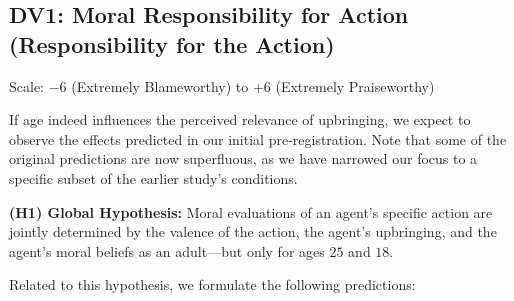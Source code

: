 \documentclass[scrarticle]{scrartcl}
\begin{document}
\subsection*{DV1: Moral Responsibility for Action (Responsibility for the Action)}
Scale: $-6$ (Extremely Blameworthy) to $+6$ (Extremely Praiseworthy)

\vspace{0.75em}
\noindent If age indeed influences the perceived relevance of upbringing, we expect to observe the effects predicted in our initial pre-registration.
Note that some of the original predictions are now superfluous, as we have narrowed our focus to a specific subset of the earlier study's conditions.

\vspace{0.75em}
\noindent \textsf{\textbf{(H1) Global Hypothesis:}}
Moral evaluations of an agent's specific action are jointly determined by the valence of the action, the agent's upbringing, and the agent's moral beliefs as an adult---but only for ages $25$ and $18$.

\vspace{0.75em}
\noindent Related to this hypothesis, we formulate the following predictions:
\end{document}
